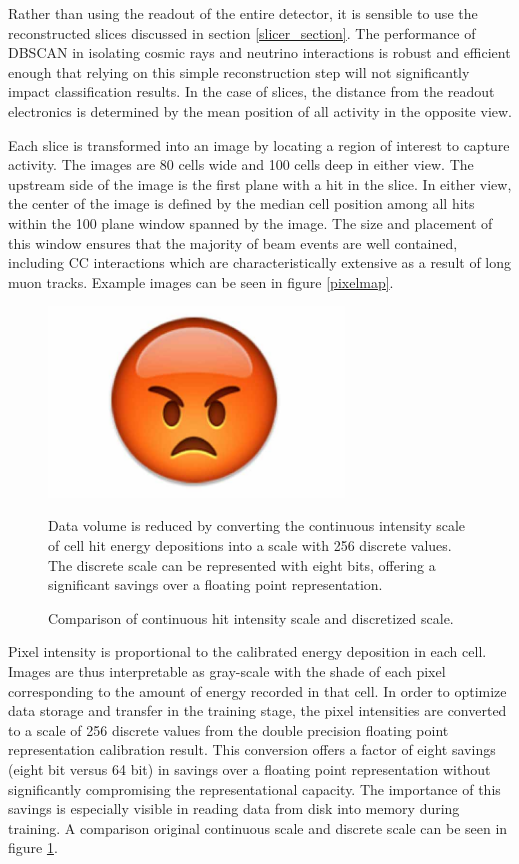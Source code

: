 Rather than using the readout of the entire detector, it is sensible to use
the reconstructed slices discussed in section \ref{slicer_section}.
The performance of DBSCAN in isolating cosmic rays and neutrino interactions
is robust and efficient enough \cite{baird2015thesis} that relying on this
simple reconstruction step will not significantly impact classification
results.
In the case of slices, the distance from the readout electronics is determined
by the mean position of all activity in the opposite view.

Each slice is transformed into an image by locating a region of interest to
capture activity.  The images are 80 cells wide and 100 cells deep in either
view.
The upstream side of the image is the first plane with a hit
in the slice.  In either view, the center of the image is defined by the
median cell position among all hits within the 100 plane window spanned by the
image.
The size and placement of this window ensures that the majority of beam events
are well contained, including \numu CC interactions which are
characteristically extensive as a result of long muon tracks.
Example images can be seen in figure \ref{pixelmap}.

\begin{figure}[t]
\begin{center}
\includegraphics[width=0.7\textwidth]{figures/dummy/dummy.jpg}
\end{center}
\caption{Comparison of continuous hit intensity scale and discretized scale.}{
Data volume is reduced by converting the continuous intensity scale of cell
hit energy depositions into a scale with 256 discrete values.
The discrete scale can be represented with eight bits, offering a significant
savings over a floating point representation.
}
\label{pixelmapadc}
\end{figure}


Pixel intensity is proportional to the calibrated energy deposition
in each cell.
Images are thus interpretable as gray-scale with the shade of
each pixel corresponding to the amount of energy recorded in that cell.
In order to optimize data storage and transfer in the training stage,
the pixel intensities are converted to a scale of 256 discrete values
from the double precision floating point representation calibration result.
This conversion offers a factor of eight savings (eight bit versus 64 bit) in
savings over a floating point representation
without significantly compromising the representational capacity.
The importance of this savings is especially visible in reading data from
disk into memory during training.
A comparison original continuous scale and discrete scale can be seen in figure
\ref{pixelmapadc}.

